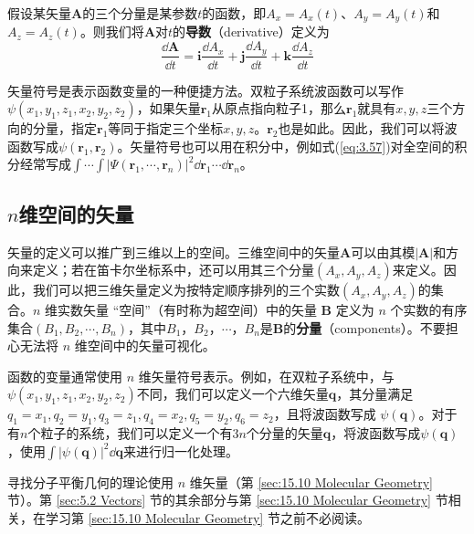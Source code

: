     假设某矢量$\mathbf{A}$的三个分量是某参数$t$的函数，即$A_x = A_x\left(t\right)$、$A_y = A_y\left(t\right)$和$A_z = A_z\left(t\right)$。则我们将$\mathbf{A}$对$t$的\textbf{导数}（derivative）定义为
    \begin{equation}
        \frac{\dd \mathbf{A}}{\dd t} = \mathbf{i}\frac{\dd A_x}{\dd t} + \mathbf{j}\frac{\dd A_y}{\dd t} + \mathbf{k}\frac{\dd A_z}{\dd t}
        \label{eq:5.32}
    \end{equation}

    矢量符号是表示函数变量的一种便捷方法。双粒子系统波函数可以写作$\psi\left(x_1,y_1,z_1,x_2,y_2,z_2\right)$，如果矢量$\mathbf{r}_1$从原点指向粒子1，那么$\mathbf{r}_1$就具有$x,y,z$三个方向的分量，指定$\mathbf{r}_1$等同于指定三个坐标$x,y,z$。$\mathbf{r}_2$也是如此。因此，我们可以将波函数写成$\psi\left(\mathbf{r}_1,\mathbf{r}_2\right)$。矢量符号也可以用在积分中，例如式(\ref{eq:3.57})对全空间的积分经常写成$\int \cdots \int\left|\Psi\left(\mathbf{r}_1,\cdots,\mathbf{r}_n\right)\right|^2\dd \mathbf{r}_1\cdots\dd \mathbf{r}_n$。
    
    
\subsection*{$n$维空间的矢量}

    矢量的定义可以推广到三维以上的空间。三维空间中的矢量$\mathbf{A}$可以由其模$\left|\mathbf{A}\right|$和方向来定义；若在笛卡尔坐标系中，还可以用其三个分量$\left(A_x,A_y,A_z\right)$来定义。因此，我们可以把三维矢量定义为按特定顺序排列的三个实数$\left(A_x,A_y,A_z\right)$的集合。$n$ 维实数矢量 “空间”（有时称为超空间）中的矢量 $\mathbf{B}$ 定义为 $n$ 个实数的有序集合$\left(B_1,B_2,\cdots,B_n\right)$，其中$B_1$，$B_2$，$\cdots$，$B_n$是$\mathbf{B}$的\textbf{分量}（components）。不要担心无法将 $n$ 维空间中的矢量可视化。

    函数的变量通常使用 $n$ 维矢量符号表示。例如，在双粒子系统中，与$\psi\left(x_1,y_1,z_1,x_2,y_2,z_2\right)$不同，我们可以定义一个六维矢量$\mathbf{q}$，其分量满足$q_1=x_1, q_2=y_1, q_3=z_1, q_4=x_2, q_5=y_2, q_6=z_2$，且将波函数写成 $\psi\left(\mathbf{q}\right)$。对于有$n$个粒子的系统，我们可以定义一个有$3n$个分量的矢量$\mathbf{q}$，将波函数写成$\psi\left(\mathbf{q}\right)$，使用$\int\left|\psi\left(\mathbf{q}\right)\right|^2\dd \mathbf{q}$来进行归一化处理。

    寻找分子平衡几何的理论使用 $n$ 维矢量（第 \ref{sec:15.10 Molecular Geometry} 节）。第 \ref{sec:5.2 Vectors} 节的其余部分与第 \ref{sec:15.10 Molecular Geometry} 节相关，在学习第 \ref{sec:15.10 Molecular Geometry} 节之前不必阅读。

